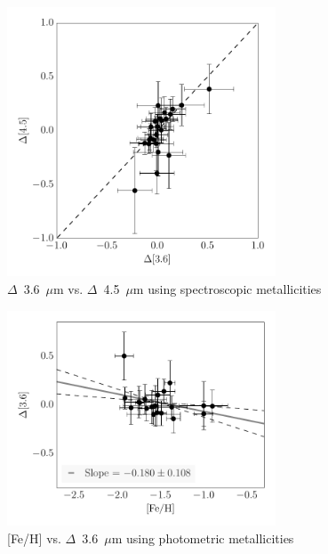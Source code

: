 \documentclass[a4paper,fleqn,usenatbib]{mnras}
\begin{document}
\begin{figure}
\begin{center}
\includegraphics[width=80mm]{final_plots/deltadelta_3p6_4p5_spect.pdf}
\caption{$\Delta$~3.6~$\mu$m vs. $\Delta$~4.5~$\mu$m using spectroscopic metallicities}
\label{fig:deltadelta_spect}
\end{center}
\end{figure}


\begin{figure}
\begin{center}
\includegraphics[width=80mm]{final_plots/delta_feh_3p6_phot.pdf}
\caption{[Fe/H] vs. $\Delta$~3.6~$\mu$m using photometric metallicities}
\label{fig:delta_3p6_phot}
\end{center}
\end{figure}
\end{document}
